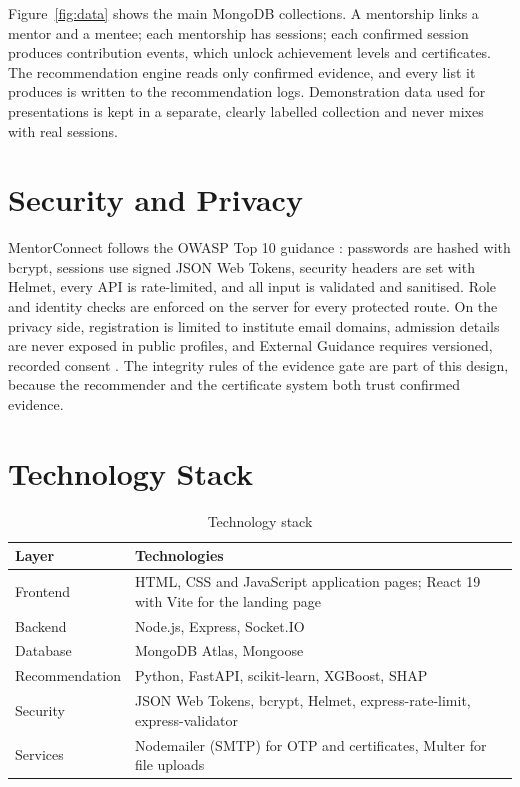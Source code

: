 \documentclass[12pt,a4paper]{report}
\begin{document}
Figure~\ref{fig:data} shows the main MongoDB collections. A mentorship links a mentor and a mentee; each mentorship has sessions; each confirmed session produces contribution events, which unlock achievement levels and certificates. The recommendation engine reads only confirmed evidence, and every list it produces is written to the recommendation logs. Demonstration data used for presentations is kept in a separate, clearly labelled collection and never mixes with real sessions.

\section{Security and Privacy}
MentorConnect follows the OWASP Top 10 guidance \cite{owasp2021}: passwords are hashed with bcrypt, sessions use signed JSON Web Tokens, security headers are set with Helmet, every API is rate-limited, and all input is validated and sanitised. Role and identity checks are enforced on the server for every protected route. On the privacy side, registration is limited to institute email domains, admission details are never exposed in public profiles, and External Guidance requires versioned, recorded consent \cite{drachsler2016}. The integrity rules of the evidence gate are part of this design, because the recommender and the certificate system both trust confirmed evidence.

\section{Technology Stack}
\begin{table}[h]
\centering
\caption{Technology stack}
\label{tab:stack}
\small
\begin{tabularx}{\textwidth}{>{\raggedright\arraybackslash}p{3.2cm}X}
\toprule
\textbf{Layer} & \textbf{Technologies}\\
\midrule
Frontend & HTML, CSS and JavaScript application pages; React 19 with Vite for the landing page\\
Backend & Node.js, Express, Socket.IO\\
Database & MongoDB Atlas, Mongoose\\
Recommendation & Python, FastAPI, scikit-learn, XGBoost, SHAP\\
Security & JSON Web Tokens, bcrypt, Helmet, express-rate-limit, express-validator\\
Services & Nodemailer (SMTP) for OTP and certificates, Multer for file uploads\\
\bottomrule
\end{tabularx}
\end{table}
\end{document}
